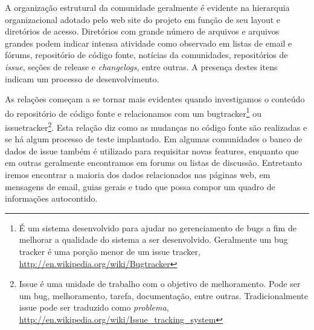 A organização estrutural da comunidade geralmente é evidente na hierarquia organizacional adotado pelo web site do projeto em função de seu layout e diretórios de acesso. Diretórios com grande número de arquivos e arquivos grandes podem indicar intensa atividade como observado em listas de email e fórums, repositório de código fonte, notícias da comunidades, repositórios de \textit{issue}, seções de release e \textit{changelogs}, entre outras. A presença destes itens indicam um processo de desenvolvimento.


As relações começam a se tornar mais evidentes quando investigamos o conteúdo do repositório de código fonte e relacionamos com um bugtracker\footnote{É um sistema desenvolvido para ajudar no gerenciamento de bugs a fim de melhorar a qualidade do sistema a ser desenvolvido. Geralmente um bug tracker é uma porção menor de um issue tracker, \url{http://en.wikipedia.org/wiki/Bugtracker}} ou issuetracker\footnote{Issue é uma unidade de trabalho com o objetivo de melhoramento. Pode ser um bug, melhoramento, tarefa, documentação, entre outras. Tradicionalmente issue pode ser traduzido como \textit{problema}, \url{http://en.wikipedia.org/wiki/Issue_tracking_system}}. Esta relação diz como as mudanças no código fonte são realizadas e se há algum processo de teste implantado. Em algumas comunidades o banco de dados de issue também é utilizado para requisitar novas features, enquanto que em outras geralmente encontramos em forums ou listas de discussão. Entretanto iremos encontrar a maioria dos dados relacionados nas páginas web, em mensagens de email, guias gerais e tudo que possa compor um quadro de informações autocontido.


